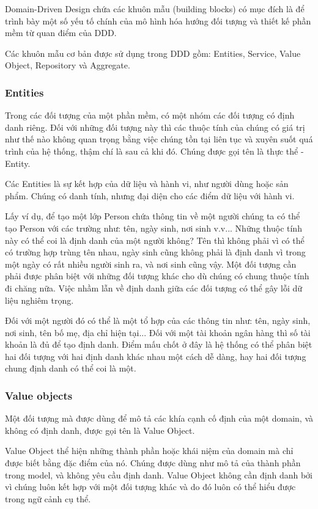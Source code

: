 Domain-Driven Design chứa các khuôn mẫu (building blocks) có mục đích là để trình bày một số yếu tố chính của mô hình hóa hướng đối tượng và thiết kế phần mềm từ quan điểm của DDD.

Các khuôn mẫu cơ bản được sử dụng trong DDD gồm: Entities, Service, Value Object, Repository và Aggregate.

\subsubsection{Entities}

Trong các đối tượng của một phần mềm, có một nhóm các đối tượng có định danh riêng. Đối với những đối tượng này thì các thuộc tính của chúng có giá trị như thế nào không quan trọng bằng việc chúng tồn tại liên tục và xuyên suốt quá trình của hệ thống, thậm chí là sau cả khi đó. Chúng được gọi tên là thực thể - Entity.

Các Entities là sự kết hợp của dữ liệu và hành vi, như người dùng hoặc sản phẩm. Chúng có danh tính, nhưng đại diện cho các điểm dữ liệu với hành vi.

Lấy ví dụ, để tạo một lớp Person chứa thông tin về một người chúng ta có thể tạo Person với các trường như: tên, ngày sinh, nơi sinh v.v... Những thuộc tính này có thể coi là định danh của một người không? Tên thì không phải vì có thể có trường hợp trùng tên nhau, ngày sinh cũng không phải là định danh vì trong một ngày có rất nhiều người sinh ra, và nơi sinh cũng vậy. Một đối tượng cần phải được phân biệt với những đối tượng khác cho dù chúng có chung thuộc tính đi chăng nữa. Việc nhầm lẫn về định danh giữa các đối tượng có thể gây lỗi dữ liệu nghiêm trọng.

Đối với một người đó có thể là một tổ hợp của các thông tin như: tên, ngày sinh, nơi sinh, tên bố mẹ, địa chỉ hiện tại... Đối với một tài khoản ngân hàng thì số tài khoản là đủ để tạo định danh. Điểm mấu chốt ở đây là hệ thống có thể phân biệt hai đối tượng với hai định danh khác nhau một cách dễ dàng, hay hai đối tượng chung định danh có thể coi là một.

\subsubsection{Value objects}

Một đối tượng mà được dùng để mô tả các khía cạnh cố định của một domain, và không có định danh, được gọi tên là Value Object.

Value Object thể hiện những thành phần hoặc khái niệm của domain mà chỉ được biết bằng đặc điểm của nó. Chúng được dùng như mô tả của thành phần trong model, và không yêu cầu định danh. Value Object không cần định danh bởi vì chúng luôn kết hợp với một đối tượng khác và do đó luôn có thể hiểu được trong ngữ cảnh cụ thể.

